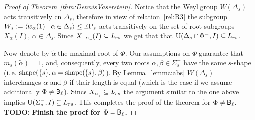\begin{proof}[Proof of Theorem~\ref{thm:DennisVaserstein}]
Notice that the Weyl group $W(\Delta_s)$ acts transitively on $\Delta_s$, therefore in view of relation~\ref{rel:R3} the subgroup
$W_s := \langle w_\alpha(1) \mid \alpha\in\Delta_s\rangle \leq \operatorname{EP}_s$ acts transitively on the set of root subgroups $X_\alpha(I)$, $\alpha\in \Delta_s$.
Since $X_{-\alpha\ssub{r}}(I) \subseteq L_{rs}$ we get that that $\operatorname{U}(\Delta_s \cap \Phi^-, I)\subseteq L_{rs}$.

Now denote by $\widetilde{\alpha}$ the maximal root of $\Phi$. Our assumptions on $\Phi$ guarantee that $m_s(\widetilde{\alpha})=1$, 
and, consequently, every two roots $\alpha, \beta \in \Sigma^-_s$ have the same $s$-shape (i.\,e. $\operatorname{shape}(\{s\}, \alpha = \operatorname{shape}(\{s\}, \beta)$).
By Lemma~\ref{lemma:abs} $W(\Delta_s)$ interchanges $\alpha$ and $\beta$ if their length is equal (which is the case if we assume additionally $\Phi\neq \mathsf{B}_\ell$).
Since $X_{\alpha\ssub{s}} \subseteq L_{rs}$ the argument similar to the one above implies $\operatorname{U}(\Sigma^-_s, I)\subseteq L_{rs}$.
This completes the proof of the theorem for $\Phi\neq \mathsf{B}_\ell$. 
\textbf{TODO: Finish the proof for $\Phi=\mathsf{B}_\ell$.}
\end{proof}
